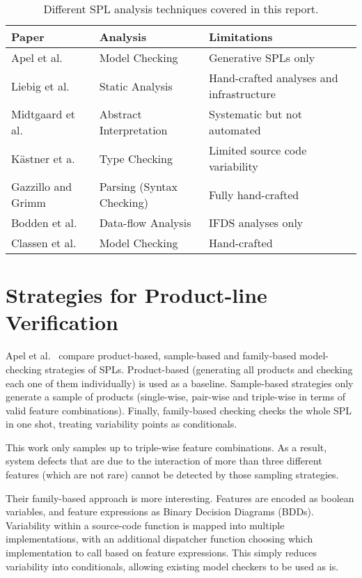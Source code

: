 \documentclass[11pt]{article}
\begin{document}
\begin{table}[h!]
\begin{tabular}{ |l|l|l|l|}
\hline
Paper & Analysis & Limitations \\
\hline
Apel et al.~\cite{Apel:2013} & Model Checking & Generative SPLs only  \\
Liebig et al.~\cite{Liebig:2013} & Static Analysis & Hand-crafted analyses and infrastructure  \\
Midtgaard et al.~\cite{Midtgaard:2015} & Abstract Interpretation & Systematic but not automated \\
K\"{a}stner et a.~\cite{Kastner:2012} & Type Checking & Limited source code variability \\
Gazzillo and Grimm~\cite{Gazzillo:2012} & Parsing (Syntax Checking) & Fully hand-crafted \\
Bodden et al.~\cite{Bodden:2013} & Data-flow Analysis & IFDS analyses only \\
Classen et al.~\cite{Classen:2013} & Model Checking & Hand-crafted \\
\hline
\end{tabular}
\caption{Different SPL analysis techniques covered in this report.}
\label{tbl1}
\end{table}

\section{Strategies for Product-line Verification}

Apel et al.~\cite{Apel:2013} compare product-based, sample-based and family-based model-checking strategies of SPLs. Product-based (generating all products and checking each one of them individually) is used as a baseline. Sample-based strategies only generate a sample of products (single-wise, pair-wise and triple-wise in terms of valid feature combinations). Finally, family-based checking checks the whole SPL in one shot, treating variability points as conditionals.

This work only samples up to triple-wise feature combinations. As a result, system defects that are due to the interaction of more than three different features (which are not rare) cannot be detected by those sampling strategies. 

Their family-based approach is more interesting. Features are encoded as boolean variables, and feature expressions as Binary Decision Diagrams (BDDs). Variability within a source-code function is mapped into multiple implementations, with an additional dispatcher function choosing which implementation to call based on feature expressions. This simply reduces variability into conditionals, allowing existing model checkers to be used as is.
\end{document}
